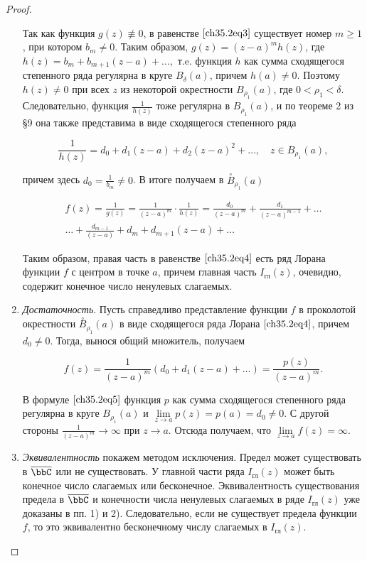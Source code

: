\begin{proof}
\begin{enumerate}
Так как функция $g(z) \not\equiv 0$, в равенстве $\eqref{ch35.2eq3}$ существует номер $m \ge 1$, при котором $b_m \not= 0$. Таким образом, $g(z) = (z - a)^{m} h(z)$, где $h(z) = b_m + b_{m + 1} (z - a) + \ldots ,$ т.e. функция $h$ как сумма сходящегося степенного ряда регулярна в круге $B_{\delta}(a)$, причем $h(a) \not= 0$. Поэтому $h(z) \not= 0$ при всех $z$ из некоторой окрестности $B_{\rho_1}(a)$, где $0 < \rho_1 < \delta$. Следовательно, функция $\frac{1}{h(z)}$ тоже регулярна в $B_{\rho_1}(a)$, и по теореме 2 из \S 9 она также представима в виде сходящегося степенного ряда

$$
\frac{1}{h(z)} = d_0 + d_1 (z - a) + d_2 (z - a)^2 + \ldots , \quad z \in B_{\rho_1}(a),
$$

причем здесь $d_0 = \frac{1}{b_m} \not= 0$. В итоге получаем в $\overset{\circ}{B}_{\rho_1}(a)$

\begin{multline} \label{ch35.2eq4}
f(z) = \frac{1}{g(z)} = \frac{1}{(z - a)^m} \cdot \frac{1}{h(z)} = \frac{d_0}{(z - a)^m} + \frac{d_1}{(z - a)^{m - 1}} + \ldots \\ \ldots+ \frac{d_{m - 1}}{(z - a)} + d_m + d_{m + 1} (z - a) + \ldots 
\end{multline}

Таким образом, правая часть в равенстве $\eqref{ch35.2eq4}$ есть ряд Лорана функции $f$ с центром в точке $a$, причем главная часть $I_{\text{гл}}(z)$, очевидно, содержит конечное число ненулевых слагаемых.

\item \textit{Достаточность}. Пусть справедливо представление функции $f$ в проколотой окрестности $\overset{\circ}{B}_{\rho_1}(a)$ в виде сходящегося ряда Лорана $\eqref{ch35.2eq4}$, причем $d_0 \not= 0$. Тогда, вынося общий множитель, получаем

\begin{equation} \label{ch35.2eq5}
f(z) = \frac{1}{(z - a)^m} (d_0 + d_1 (z - a) + \ldots) = \frac{p(z)}{(z - a)^m}.
\end{equation}

В формуле $\eqref{ch35.2eq5}$ функция $p$ как сумма сходящегося степенного ряда регулярна в круге $B_{\rho_1}(a)$ и $\lim\limits_{z \to a} p(z) = p(a) = d_0 \not= 0$. С другой стороны $\frac{1}{(z - a)^m} \to \infty$ при $z \to a$. Отсюда получаем, что $\lim\limits_{z \to a} f(z) = \infty$.

\item	\textit{Эквивалентность} покажем методом исключения. Предел может существовать в $\overline{\bbC}$ или не существовать. У главной части ряда $I_{\text{гл}}(z)$ может быть конечное число слагаемых или бесконечное. Эквивалентность существования предела в $\overline{\bbC}$ и конечности числа ненулевых слагаемых в ряде $I_{\text{гл}}(z)$ уже доказаны в пп. 1) и 2). Следовательно, если не существует предела функции $f$, то это эквивалентно бесконечному числу слагаемых в $I_{\text{гл}}(z)$.


\end{enumerate}
\end{proof}
